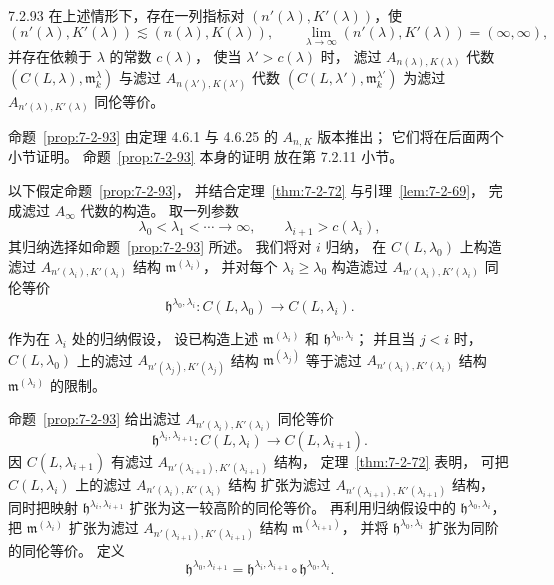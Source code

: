 \begin{proposition}{7.2.93}\label{prop:7-2-93}
在上述情形下，存在一列指标对
$(n'(\lambda),K'(\lambda))$，使
\[
(n'(\lambda),K'(\lambda))
\lesssim(n(\lambda),K(\lambda)),
\qquad
\lim_{\lambda\to\infty}
(n'(\lambda),K'(\lambda))=(\infty,\infty),
\]
并存在依赖于 $\lambda$ 的常数 $c(\lambda)$，
使当 $\lambda'>c(\lambda)$ 时，
滤过 $A_{n(\lambda),K(\lambda)}$ 代数
$(C(L,\lambda),\mathfrak m^\lambda_k)$
与滤过 $A_{n(\lambda'),K(\lambda')}$ 代数
$(C(L,\lambda'),\mathfrak m^{\lambda'}_k)$
为滤过 $A_{n'(\lambda),K'(\lambda)}$ 同伦等价。
\end{proposition}

命题~\ref{prop:7-2-93}
由定理 4.6.1 与 4.6.25 的
$A_{n,K}$ 版本推出；
它们将在后面两个小节证明。
命题~\ref{prop:7-2-93} 本身的证明
放在第 7.2.11 小节。

以下假定命题~\ref{prop:7-2-93}，
并结合定理~\ref{thm:7-2-72}
与引理~\ref{lem:7-2-69}，
完成滤过 $A_\infty$ 代数的构造。
取一列参数
\[
\lambda_0<\lambda_1<\cdots\longrightarrow\infty,
\qquad
\lambda_{i+1}>c(\lambda_i),
\]
其归纳选择如命题~\ref{prop:7-2-93} 所述。
我们将对 $i$ 归纳，
在 $C(L,\lambda_0)$ 上构造
滤过 $A_{n'(\lambda_i),K'(\lambda_i)}$ 结构
$\mathfrak m^{(\lambda_i)}$，
并对每个 $\lambda_i\ge\lambda_0$
构造滤过 $A_{n'(\lambda_i),K'(\lambda_i)}$
同伦等价
\[
\mathfrak h^{\lambda_0,\lambda_i}\colon
C(L,\lambda_0)\longrightarrow C(L,\lambda_i).
\]

作为在 $\lambda_i$ 处的归纳假设，
设已构造上述
$\mathfrak m^{(\lambda_i)}$
和 $\mathfrak h^{\lambda_0,\lambda_i}$；
并且当 $j<i$ 时，
$C(L,\lambda_0)$ 上的滤过
$A_{n'(\lambda_j),K'(\lambda_j)}$ 结构
$\mathfrak m^{(\lambda_j)}$
等于滤过 $A_{n'(\lambda_i),K'(\lambda_i)}$ 结构
$\mathfrak m^{(\lambda_i)}$ 的限制。

命题~\ref{prop:7-2-93} 给出滤过
$A_{n'(\lambda_i),K'(\lambda_i)}$ 同伦等价
\[
\mathfrak h^{\lambda_i,\lambda_{i+1}}\colon
C(L,\lambda_i)\longrightarrow C(L,\lambda_{i+1}).
\]
因 $C(L,\lambda_{i+1})$ 有滤过
$A_{n'(\lambda_{i+1}),K'(\lambda_{i+1})}$ 结构，
定理~\ref{thm:7-2-72} 表明，
可把 $C(L,\lambda_i)$ 上的滤过
$A_{n'(\lambda_i),K'(\lambda_i)}$ 结构
扩张为滤过
$A_{n'(\lambda_{i+1}),K'(\lambda_{i+1})}$ 结构，
同时把映射
$\mathfrak h^{\lambda_i,\lambda_{i+1}}$
扩张为这一较高阶的同伦等价。
再利用归纳假设中的
$\mathfrak h^{\lambda_0,\lambda_i}$，
把 $\mathfrak m^{(\lambda_i)}$
扩张为滤过
$A_{n'(\lambda_{i+1}),K'(\lambda_{i+1})}$ 结构
$\mathfrak m^{(\lambda_{i+1})}$，
并将 $\mathfrak h^{\lambda_0,\lambda_i}$
扩张为同阶的同伦等价。
定义
\[
\mathfrak h^{\lambda_0,\lambda_{i+1}}
=\mathfrak h^{\lambda_i,\lambda_{i+1}}
\circ\mathfrak h^{\lambda_0,\lambda_i}.
\]

